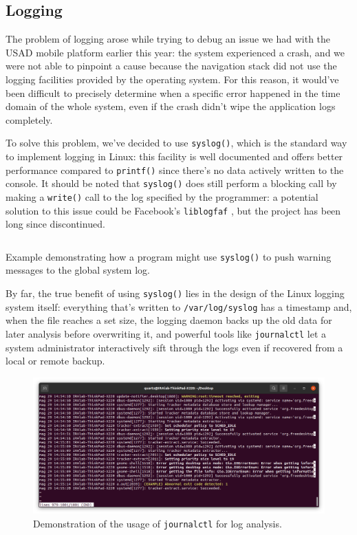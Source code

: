 \documentclass[a4paper,12pt]{report}
\begin{document}
\subsection{Logging}

The problem of logging arose while trying to debug an issue we had with the USAD mobile platform earlier this year: the system experienced a crash, and we were not able to pinpoint a cause because the navigation stack did not use the logging facilities provided by the operating system. For this reason, it would've been difficult to precisely determine when a specific error happened in the time domain of the whole system, even if the crash didn't wipe the application logs completely.

To solve this problem, we've decided to use \texttt{syslog()}, which is the standard way to implement logging in Linux: this facility is well documented and offers better performance compared to \texttt{printf()} since there's no data actively written to the console. It should be noted that \texttt{syslog()} does still perform a blocking call by making a \texttt{write()} call to the log specified by the programmer: a potential solution to this issue could be Facebook's \texttt{liblogfaf} \cite{fb-liblogfaf}, but the project has been long since discontinued.

\begin{listing}[H]
\inputminted[frame=single,framesep=10pt]{c}{snippets/syslog-example.c}
\caption{Example demonstrating how a program might use \texttt{syslog()} to push warning messages to the global system log.}
\end{listing}

By far, the true benefit of using \texttt{syslog()} lies in the design of the Linux logging system itself: everything that's written to \texttt{/var/log/syslog} has a timestamp and, when the file reaches a set size, the logging daemon backs up the old data for later analysis before overwriting it, and powerful tools like \texttt{journalctl} let a system administrator interactively sift through the logs even if recovered from a local or remote backup.

\begin{figure}[H]
    \centering
    \includegraphics[width=\textwidth]{img/journalctl.png}
    \caption{Demonstration of the usage of \texttt{journalctl} for log analysis.}
\end{figure}
\end{document}

